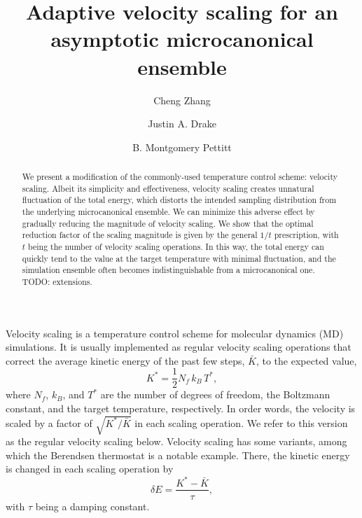 \documentclass[reprint]{revtex4-1}
\begin{document}
\title{Adaptive velocity scaling for an asymptotic
microcanonical ensemble}

\author{Cheng Zhang}
\author{Justin A. Drake}
\author{B. Montgomery Pettitt}

\begin{abstract}
  We present a modification of the commonly-used
  temperature control scheme: velocity scaling.
  Albeit its simplicity and effectiveness,
  velocity scaling creates unnatural fluctuation
  of the total energy, which distorts
  the intended sampling distribution
  from the underlying microcanonical ensemble.
  We can minimize this adverse effect by
  gradually reducing the magnitude of velocity scaling.
  We show that the optimal reduction factor of the scaling magnitude
  is given by the general $1/t$ prescription,
  with $t$ being the number of velocity scaling operations.
  In this way,
  the total energy can quickly tend to the value
  at the target temperature
  with minimal fluctuation,
  and the simulation ensemble often becomes
  indistinguishable from a microcanonical one.
  TODO: extensions.
\end{abstract}

\maketitle



Velocity scaling is a temperature control scheme
for molecular dynamics (MD) simulations.
%
It is usually implemented as
regular velocity scaling operations
that correct the average
kinetic energy of the past few steps, $\bar K$,
to the expected value\cite{frenkel, haile},
%
\begin{equation}
  K^* = \frac{1}{2} N_f \, k_B \, T^*
  ,
  \label{eq:K_canon}
\end{equation}
%
where $N_f$, $k_B$, and $T^*$ are the number of degrees of freedom,
the Boltzmann constant, and the target temperature, respectively.
%
In order words,
the velocity is scaled by a factor of
$\sqrt{ K^* / \bar K }$
in each scaling operation.
%
We refer to this version as the regular velocity scaling below.
%
Velocity scaling has some variants,
among which
the Berendsen thermostat\cite{berendsen1984}
is a notable example.
%
There,
the kinetic energy is changed in each scaling operation
by
%
\begin{equation}
  \delta E = \frac{ K^* - \bar K } { \tau },
  \label{eq:Berendsen}
\end{equation}
%
with $\tau$ being a damping constant.
\end{document}
